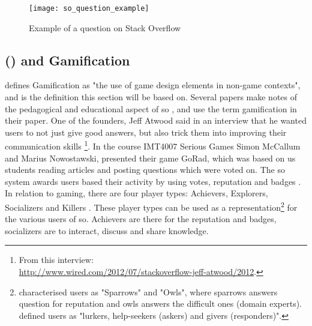 \begin{figure}[ht]
	\centering
	\texttt{[image: so\_question\_example]}
	\caption[Example of a question on Stack Overflow]{Example of a question on Stack Overflow\footnotemark}
	\label{fig:so_question_example}
\end{figure}

\subsection[Stack Overflow and Gamification]{ () and Gamification}
\label{sec:stackoverflow_gamification}
\textcite{Deterding2011} defines Gamification as "the use of game design elements in non-game contexts", and is the definition this section will be based on. 
Several papers make notes of the pedagogical and educational aspect of \gls{so} \cite{Nasehi2012, Posnett2012, Yang2014}, and \cite{Nasehi2012, Yang2014} use the term gamification in their paper.
One of the founders, Jeff Atwood said in an interview that he wanted users to not just give good answers, but also trick them into improving their communication skills \cite{Posnett2012}\footnote{
	From this interview: \\ 
	\url{http://www.wired.com/2012/07/stackoverflow-jeff-atwood/2012}.
	}.
In the course IMT4007 Serious Games Simon McCallum and Marius Nowostawski, presented their game GoRad, which was based on us students reading articles and posting questions which were voted on. 
The \gls{so} system awards users based their activity by using votes, reputation and badges \cite{M.Sewak2010, Movshovitz-Attias2013, Treude2011, StackOverflow.com2016, StackOverflow.com2016d}.
In relation to gaming, there are four player types: Achievers, Explorers, Socializers and Killers \cite[p.~3]{Maan2013}.
\vspace{0.5em}\newline
These player types can be used as a representation\footnote{	
	\textcite{Yang2014} characterised users as "Sparrows" and "Owls", where sparrows answers question for reputation and owls answers the difficult ones (domain experts).  \\
	\textcite[p.~2]{Ahmed2015} defined users as "lurkers, help-seekers (askers) and givers (responders)".	
	} for the various users of \gls{so}. 
Achievers are there for the reputation and badges, socializers are to interact, discuss and share knowledge. 
